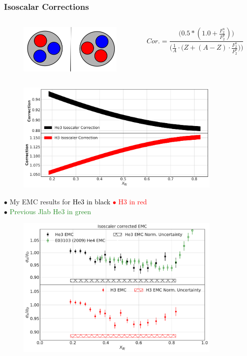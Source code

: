 \documentclass[12pt,usenames,dvipsnames]{beamer}
\begin{document}
\begin{frame}{}
\frametitle{Isoscalar Corrections}
\vspace*{-1cm}
\begin{columns}
\begin{figure}
	\includegraphics[width =5cm]{../images/mirror}
\end{figure}
\begin{equation}
Cor. = \frac{\Big(0.5*(1.0 + \frac{F_2^n}{F_2^p})\Big)}{ \Big(\frac{1}{A} \cdot \big(Z+(A-Z)\cdot \frac{F_2^n}{F_2^p}\big) \Big) }\nonumber
\end{equation}
\end{columns}

\begin{figure}
	\includegraphics[width =10cm]{../images/IsoCor.pdf}
\end{figure}

\end{frame}
\begin{frame}{}
$\bullet$ My EMC results for \textcolor{black}{He3 in black} \textcolor{red}{$\bullet$ H3 in red}\\
$\bullet$ \textcolor{ForestGreen}{Previous Jlab He3 in green}
\begin{figure}
	\includegraphics[width=10cm]{../images/EMCIsotwo.pdf}
\end{figure}
\end{frame}
\end{document}
